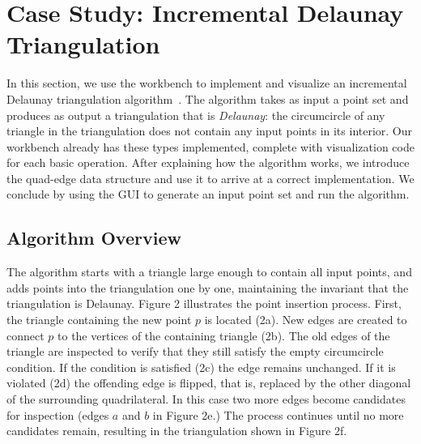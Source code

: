 
\FloatBarrier
\section{Case Study: Incremental Delaunay Triangulation}
\label{sec:case-delaunay}

In this section, we use the workbench to implement and visualize an incremental
Delaunay triangulation algorithm~\cite{lischinski1994incremental}. The algorithm
takes as input a point set and produces as output a triangulation that is
\emph{Delaunay}: the circumcircle of any triangle in the triangulation does not
contain any input points in its interior. Our workbench already has these types
implemented, complete with visualization code for each basic operation.
After explaining how the algorithm works, we introduce the quad-edge data
structure and use it to arrive at a correct implementation. We conclude by using
the GUI to generate an input point set and run the algorithm. 


\subsection{Algorithm Overview}

The algorithm starts with a triangle large enough to contain all input points,
and adds points into the triangulation one by one, maintaining the invariant
that the triangulation is Delaunay. Figure 2 illustrates the point insertion
process. First, the triangle containing the new point $p$ is located (2a). New
edges are created to connect $p$ to the vertices of the containing triangle
(2b). The old edges of the triangle are inspected to verify that they still
satisfy the empty circumcircle condition. If the condition is satisfied (2c) the
edge remains unchanged. If it is violated (2d) the offending edge is flipped,
that is, replaced by the other diagonal of the surrounding quadrilateral. In
this case two more edges become candidates for inspection (edges $a$ and $b$ in
Figure 2e.) The process continues until no more candidates remain, resulting in
the triangulation shown in Figure 2f.


